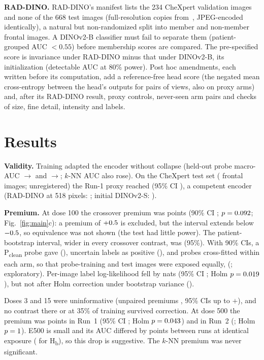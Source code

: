 \documentclass{article}
\begin{document}
\textbf{RAD-DINO.} RAD-DINO's manifest lists the 234 CheXpert validation images and none of the 668 test images (full-resolution copies from~\cite{saporta2022chexlocalize}, JPEG-encoded identically), a natural but non-randomized split into \NMembers{} member and \NNonmembers{} non-member frontal images. A DINOv2-B classifier must fail to separate them (patient-grouped AUC $<0.55$) before membership scores are compared. The pre-specified score is invariance under RAD-DINO minus that under DINOv2-B, its initialization (detectable AUC \MDE{} at 80\% power). Post hoc amendments, each written before its computation, add a reference-free head score (the negated mean cross-entropy between the head's outputs for pairs of views, also on proxy arms) and, after its RAD-DINO result, proxy controls, never-seen arm pairs and checks of size, fine detail, intensity and labels.

\section{Results}\label{sec:results}
\textbf{Validity.} Training adapted the encoder without collapse (held-out probe macro-AUC \AdaptOneStart{}$\to$\allowbreak\AdaptOneEnd{} and \AdaptTwoStart{}$\to$\allowbreak\AdaptTwoEnd; $k$-NN AUC also rose). On the CheXpert test set (\ExtN{} frontal images; unregistered) the Run-1 proxy reached \ExtProxy{} (95\% CI \ExtProxyCI), a competent encoder (RAD-DINO at 518 pixels: \ExtRad; initial DINOv2-S: \ExtInit).

\textbf{Premium.} At dose 100 the crossover premium was \PrimDelta{} points (90\% CI \PrimCI; $p=0.092$; Fig.~\ref{fig:main}c): a premium of $+0.5$ is excluded, but the interval extends below $-0.5$, so equivalence was not shown (the test had little power). The patient-bootstrap interval, wider in every crossover contrast, was \PrimBootCI{} (95\%). With 90\% CIs, a P\textsubscript{clean} probe gave \CleanDelta{} (\CleanCI), uncertain labels as positive \UoneDelta{} (\UoneCI), and probes cross-fitted within each arm, so that probe-training and test images were exposed equally, \MatchedDelta{} (\MatchedCI; exploratory). Per-image label log-likelihood fell by \LLDrop{} nats (95\% CI \LLCI; Holm $p=0.019$), but not after Holm correction under bootstrap variance (\LLBootCI).

Doses 3 and 15 were uninformative (unpaired premiums \LowRange, 95\% CIs up to $+$\LowCIMax), and no contrast there or at 35\% of training survived correction. At dose 500 the premium was \EFiveHundredOne{} points in Run~1 (95\% CI \EFiveHundredOneCI; Holm $p=0.043$) and \EFiveHundredTwo{} in Run~2 (\EFiveHundredTwoCI; Holm $p=1$). E500 is small and its AUC differed by \EFiveHundredRunGap{} points between runs at identical exposure (\HbRunGap{} for H\textsubscript{b}), so this drop is suggestive. The $k$-NN premium was never significant.
\end{document}
